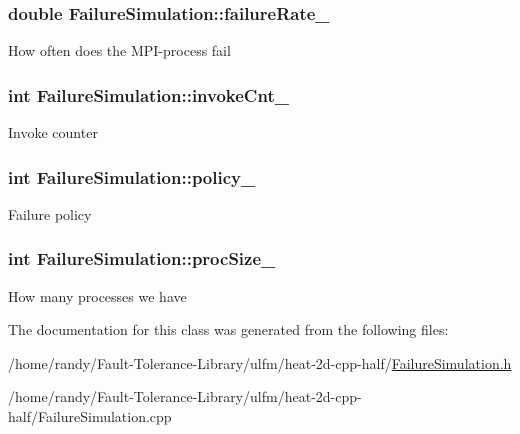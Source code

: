 \subsubsection[{\texorpdfstring{failure\+Rate\+\_\+}{failureRate_}}]{\setlength{\rightskip}{0pt plus 5cm}double Failure\+Simulation\+::failure\+Rate\+\_\+\hspace{0.3cm}{\ttfamily [private]}}\hypertarget{classFailureSimulation_ad7db683f7b53f7ae2907aa2299bf30cd}{}\label{classFailureSimulation_ad7db683f7b53f7ae2907aa2299bf30cd}
How often does the M\+P\+I-\/process fail 
\subsubsection[{\texorpdfstring{invoke\+Cnt\+\_\+}{invokeCnt_}}]{\setlength{\rightskip}{0pt plus 5cm}int Failure\+Simulation\+::invoke\+Cnt\+\_\+\hspace{0.3cm}{\ttfamily [private]}}\hypertarget{classFailureSimulation_aefff5ead95ce91fc60cb8a814aa1ea06}{}\label{classFailureSimulation_aefff5ead95ce91fc60cb8a814aa1ea06}
Invoke counter 
\subsubsection[{\texorpdfstring{policy\+\_\+}{policy_}}]{\setlength{\rightskip}{0pt plus 5cm}int Failure\+Simulation\+::policy\+\_\+\hspace{0.3cm}{\ttfamily [private]}}\hypertarget{classFailureSimulation_a59f1e391b8056b83f2bde5450d3f95c2}{}\label{classFailureSimulation_a59f1e391b8056b83f2bde5450d3f95c2}
Failure policy 
\subsubsection[{\texorpdfstring{proc\+Size\+\_\+}{procSize_}}]{\setlength{\rightskip}{0pt plus 5cm}int Failure\+Simulation\+::proc\+Size\+\_\+\hspace{0.3cm}{\ttfamily [private]}}\hypertarget{classFailureSimulation_a1f1cd48b5fe41eed41be69c20d6fe150}{}\label{classFailureSimulation_a1f1cd48b5fe41eed41be69c20d6fe150}
How many processes we have 

The documentation for this class was generated from the following files\+:\begin{DoxyCompactItemize}
\item 
/home/randy/\+Fault-\/\+Tolerance-\/\+Library/ulfm/heat-\/2d-\/cpp-\/half/\hyperlink{FailureSimulation_8h}{Failure\+Simulation.\+h}\item 
/home/randy/\+Fault-\/\+Tolerance-\/\+Library/ulfm/heat-\/2d-\/cpp-\/half/Failure\+Simulation.\+cpp\end{DoxyCompactItemize}
